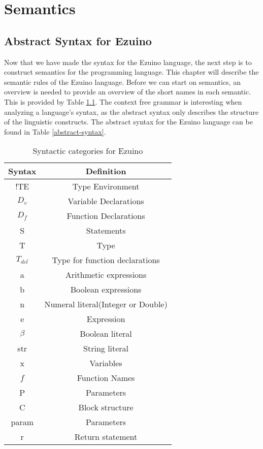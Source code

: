 \chapter{Semantics}
\label{semantics}
\section{Abstract Syntax for Ezuino}
Now that we have made the syntax for the Ezuino language, the next step is to construct semantics for the programming language. This chapter will describe the semantic rules of the Ezuino language.
Before we can start on semantics, an overview is needed to provide an overview of the short names in each semantic. This is provided by 
Table \ref{syntactic-categories}. 
The context free grammar is interesting when analyzing a language's syntax, as the abstract syntax only describes the structure of the linguistic constructs. The abstract syntax for the Ezuino language can be found in  Table \ref{abstract-syntax}.
\begin{table}[H]
\centering
\begin{tabular}{|c|c|}
\hline
\textbf{Syntax} & \textbf{Definition}   \\ \hline
!TE              & Type Environment      \\ \hline
$D_v$           & Variable Declarations \\ \hline
$D_f$           & Function Declarations \\ \hline
S               & Statements            \\ \hline
T               & Type                  \\ \hline
$T_{dcl}$         & Type for function declarations\\ \hline
a               & Arithmetic expressions\\ \hline
b               & Boolean expressions   \\ \hline
n               & Numeral literal(Integer or Double) \\ \hline
e               & Expression            \\ \hline
$\beta$         & Boolean literal       \\ \hline
str             & String literal        \\ \hline
x               & Variables             \\ \hline
$f$             & Function Names        \\ \hline
P               & Parameters            \\ \hline
C               & Block structure       \\ \hline
param           & Parameters            \\ \hline
r               & Return statement      \\ \hline
\end{tabular}
\caption{Syntactic categories for Ezuino}
\label{syntactic-categories}
\end{table}

